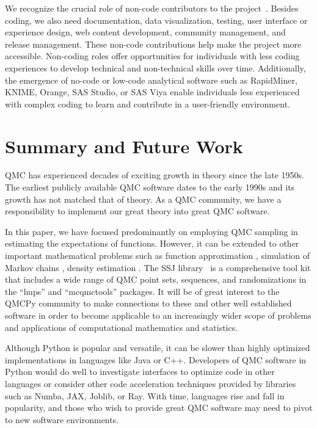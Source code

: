 \documentclass[graybox]{svmult}
\begin{document}
We recognize the crucial role of non-code contributors to the project~\cite{K23}. Besides coding, we also need documentation, data visualization, testing, user interface or experience design, web content development, community management, and release management. These non-code contributions help make the project more  accessible. Non-coding roles offer opportunities for individuals with less coding experiences to develop technical and non-technical skills over time.  Additionally, the emergence of no-code or low-code analytical software such as RapidMiner, KNIME, Orange, SAS Studio, or SAS Viya enable individuals less experienced with complex coding to learn and contribute in a user-friendly environment.


\section{Summary and Future Work}
QMC has experienced decades of exciting growth in theory since the late 1950s.  The earliest publicly available QMC software dates to the early 1990s and its growth has not matched that of theory.  As a QMC community, we have a responsibility to implement our great theory into great QMC software.

In this paper, we have focused predominantly on employing QMC sampling in estimating the expectations of functions. However, it can be extended to other important mathematical problems such as function approximation \cite{Kmmerer2015, PotSch21}, simulation of Markov chains \cite{l2018sorting,puchhammer2021variance},  density estimation \cite{LEcuyer2022b}.
The SSJ library~\cite{l2002ssj} is a comprehensive tool kit that includes a wide range of QMC point sets, sequences, and randomizations in the ``hups'' and ``mcqmctools'' packages. It will be of great interest to the QMCPy community to make connections to these and other well established software in order to become applicable to an increasingly wider scope of problems and applications of computational mathematics and statistics.

Although Python is popular and versatile, it can be slower than highly optimized implementations in languages like Java or C++.  Developers of QMC software in Python would do well to investigate interfaces to optimize code in other languages or consider other code acceleration techniques provided by libraries such as Numba, JAX, Joblib, or Ray.  With time, languages rise and fall in popularity, and those who wish to provide great QMC software may need to pivot to new software environments.
\end{document}

